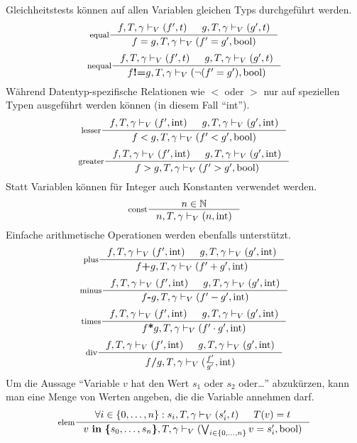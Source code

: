 Gleichheitstests können auf allen Variablen gleichen Typs durchgeführt werden.
\[
\inference[equal]{f,T,\gamma\vdash_V (f',t) & g,T,\gamma\vdash_V (g',t)}{f=g,T,\gamma\vdash_V(f'=g',\textrm{bool})}
\]
\[
\inference[nequal]{f,T,\gamma\vdash_V (f',t) & g,T,\gamma\vdash_V (g',t)}{f\textbf{!=}g,T,\gamma\vdash_V(\lnot(f'=g'),\textrm{bool})}
\]
Während Datentyp-spezifische Relationen wie $<$ oder $>$ nur auf speziellen Typen ausgeführt werden können (in diesem Fall "`int"').
\[
\inference[lesser]{f,T,\gamma\vdash_V (f',\textrm{int}) & g,T,\gamma\vdash_V (g',\textrm{int})}{f<g,T,\gamma\vdash_V(f'<g',\textrm{bool})}
\]
\[
\inference[greater]{f,T,\gamma\vdash_V (f',\textrm{int}) & g,T,\gamma\vdash_V (g',\textrm{int})}{f>g,T,\gamma\vdash_V(f'>g',\textrm{bool})}
\]
Statt Variablen können für Integer auch Konstanten verwendet werden. 
\[
\inference[const]{n\in\mathbb{N}}{n,T,\gamma\vdash_V (n,\textrm{int})}
\]
Einfache arithmetische Operationen werden ebenfalls unterstützt.
\[
\inference[plus]{f,T,\gamma\vdash_V (f',\textrm{int}) & g,T,\gamma\vdash_V (g',\textrm{int})}{f\textbf{+}g,T,\gamma\vdash_V (f'+g',\textrm{int})}
\]
\[
\inference[minus]{f,T,\gamma\vdash_V (f',\textrm{int}) & g,T,\gamma\vdash_V (g',\textrm{int})}{f\textbf{-}g,T,\gamma\vdash_V (f'-g',\textrm{int})}
\]
\[
\inference[times]{f,T,\gamma\vdash_V (f',\textrm{int}) & g,T,\gamma\vdash_V (g',\textrm{int})}{f\textbf{*}g,T,\gamma\vdash_V (f'\cdot g',\textrm{int})}
\]
\[
\inference[div]{f,T,\gamma\vdash_V (f',\textrm{int}) & g,T,\gamma\vdash_V (g',\textrm{int})}{f\textbf{/}g,T,\gamma\vdash_V (\frac{f'}{g'},\textrm{int})}
\]
Um die Aussage "`Variable $v$ hat den Wert $s_1$ oder $s_2$ oder\dots"' abzukürzen, kann man eine Menge von Werten angeben, die die Variable annehmen darf.
\[
\inference[elem]{\forall i\in\{0,\dots,n\}: s_i,T,\gamma\vdash_V (s_i',t) & T(v)=t}{v\ \textbf{in}\ \textbf{\{}s_0,\dots,s_n\textbf{\}},T,\gamma\vdash_V (\bigvee_{i\in\{0,\dots,n\}} v=s_i',\textrm{bool}) }
\]
